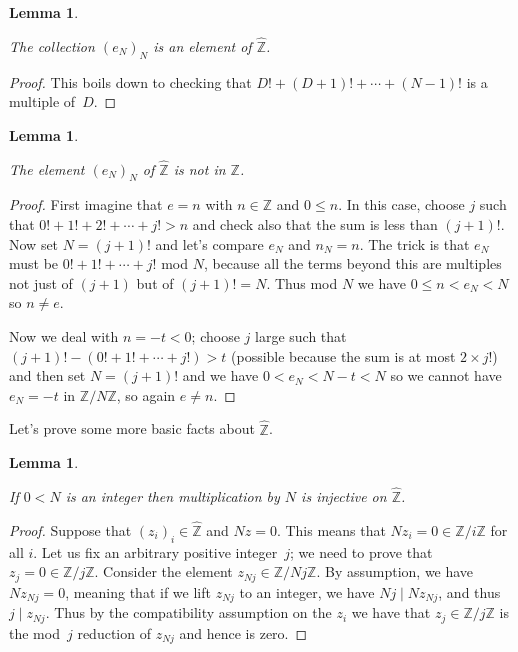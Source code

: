 \documentclass[10pt,a4paper]{article}
\newcommand{\Z}{\mathbb{Z}}
\newcommand{\Zhat}{\widehat{\Z}}
\newtheorem{lemma}[theorem]{Lemma}
\newcommand{\uses}[1]{}
\newcommand{\lean}[1]{}
\newcommand{\leanok}{}
\begin{document}
\begin{lemma}
    \label{ZHat.e_def}
    \lean{ZHat.e_def}
    \uses{ZHat.e}
    \leanok
    The collection $(e_N)_N$ is an element of $\Zhat$.
\end{lemma}
\begin{proof}
    \leanok
    This boils down to checking that $D!+(D+1)!+\cdots+(N-1)!$ is a multiple of~$D$.
\end{proof}

\begin{lemma}
    \label{ZHat.e_not_in_Int}
    \lean{ZHat.e_not_in_Int}
    \uses{ZHat.e}
    \leanok
    The element $(e_N)_N$ of $\Zhat$ is not in $\Z$.
\end{lemma}
\begin{proof}
    \leanok
    First imagine that $e=n$ with $n\in\Z$ and $0\leq n$. In this case, choose $j$
    such that $0!+1!+2!+\cdots+j!>n$ and check also that the sum is less
    than $(j+1)!$. Now set $N=(j+1)!$ and let's compare $e_N$
    and $n_N=n$. The trick is that $e_N$ must be $0!+1!+\cdots+j!$ mod $N$,
    because all the terms beyond this are multiples not just of $(j+1)$ but
    of $(j+1)!=N$. Thus mod $N$ we have $0\leq n<e_N<N$ so $n\not=e$.

    Now we deal with $n=-t<0$; choose $j$ large such that
    $(j+1)!-(0!+1!+\cdots+j!)>t$ (possible because the sum is at most $2\times j!$)
    and then set $N=(j+1)!$ and we have $0 < e_N<N-t<N$ so we cannot have $e_N=-t$ in $\Z/N\Z$,
    so again $e\not=n$.
\end{proof}

Let's prove some more basic facts about $\Zhat$.

\begin{lemma}
    \label{ZHat.torsionfree}
    \lean{ZHat.torsionfree}
    \uses{ZHat.commRing, ZHat.charZero}
    \leanok
    If $0<N$ is an integer then multiplication by $N$ is injective on $\Zhat$.
\end{lemma}
\begin{proof}
    \leanok
    Suppose that $(z_i)_i\in\Zhat$ and $Nz=0$. This means that $Nz_i=0\in\Z/i\Z$ for all $i$.
    Let us fix an arbitrary positive integer~$j$; we need to prove that $z_j=0\in\Z/j\Z$.
    Consider the element $z_{Nj}\in\Z/Nj\Z$. By assumption, we have $Nz_{Nj}=0$, meaning that
    if we lift $z_{Nj}$ to an integer, we have $Nj\mid Nz_{Nj}$, and thus $j\mid z_{Nj}$.
    Thus by the compatibility assumption on the $z_i$ we have that $z_j\in\Z/j\Z$ is the
    mod~$j$ reduction of $z_{Nj}$ and hence is zero.
\end{proof}
\end{document}
